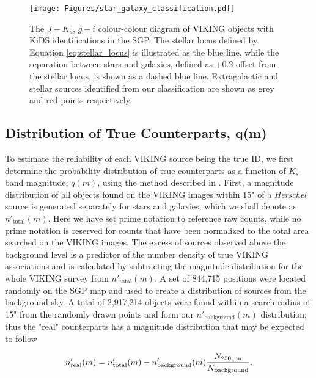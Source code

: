 \begin{figure}
    \centering
	\texttt{[image: Figures/star\_galaxy\_classification.pdf]}
	\caption{The $J - K_s$, $g-i$ colour-colour diagram of VIKING objects with KiDS identifications in the SGP. The stellar locus defined by Equation \ref{eq:stellar_locus} is illustrated as the blue line, while the separation between stars and galaxies, defined as +0.2 offset from the stellar locus, is shown as a dashed blue line. Extragalactic and stellar sources identified from our classification are shown as grey and red points respectively.}
	\label{fig:star_galaxy_classification}
\end{figure}

\subsection{Distribution of True Counterparts, q(m)}
\label{sec:true_counterparts_distribution}

To estimate the reliability of each VIKING source being the true ID, we first determine the probability distribution of true counterparts as a function of $K_s$-band magnitude, $q(m)$, using the method described in \citealt{Ciliegi_2003}. First, a magnitude distribution of all objects found on the VIKING images within 15" of a \textit{Herschel} source is generated separately for stars and galaxies, which we shall denote as $n'_{\textrm{total}}(m)$. Here we have set prime notation to reference raw counts, while no prime notation is reserved for counts that have been normalized to the total area searched on the VIKING images. The excess of sources observed above the background level is a predictor of the number density of true VIKING associations and is calculated by subtracting the magnitude distribution for the whole VIKING survey from $n'_{\textrm{total}}(m)$. A set of 844,715 positions were located randomly on the SGP map and used to create a distribution of sources from the background sky. A total of 2,917,214 objects were found within a search radius of 15" from the randomly drawn points and form our $n'_{\textrm{background}}(m)$ distribution; thus the "real" counterparts has a magnitude distribution that may be expected to follow

\begin{equation}
    n'_{\textrm{real}}(m) = n'_{\textrm{total}}(m) - n'_{\textrm{background}}(m) \frac{N_{\textrm{250\,\micron}}}{N_{\textrm{background}}},
\label{eq:real_distribution}
\end{equation}

